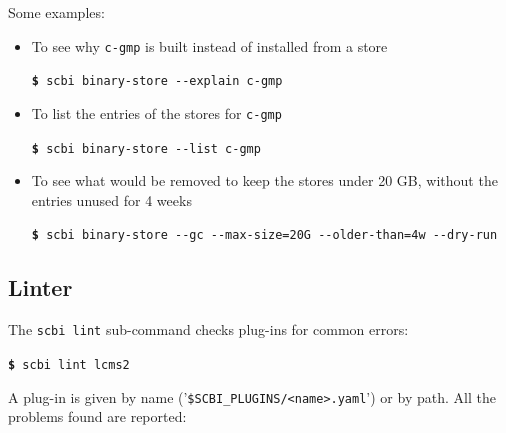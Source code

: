 \documentclass[a4paper,12pt,twoside]{article}
\newcommand{\code}[1]{\texttt{#1}}
\newcommand{\file}[1]{'{\texttt{#1}}'}
\newcommand{\cmd}[1]{\tabto{1cm}\hspace{0.5cm}\texttt{\textbf{\$} #1}}
\newcommand{\ddash}{-{}-}
\begin{document}
Some examples:

\begin{itemize}
	\item To see why \code{c-gmp} is built instead of installed from a store

	\cmd{scbi binary-store \ddash{}explain c-gmp}

	\item To list the entries of the stores for \code{c-gmp}

	\cmd{scbi binary-store \ddash{}list c-gmp}

	\item To see what would be removed to keep the stores under 20 GB, without the entries unused for 4 weeks

	\cmd{scbi binary-store \ddash{}gc \ddash{}max-size=20G \ddash{}older-than=4w \ddash{}dry-run}
\end{itemize}

\subsection{Linter}
\label{linter}

The \code{scbi lint} sub-command checks plug-ins for common errors:

\cmd{scbi lint lcms2}

A plug-in is given by name (\file{\$SCBI\_PLUGINS/<name>.yaml}) or by path.
All the problems found are reported:
\end{document}
